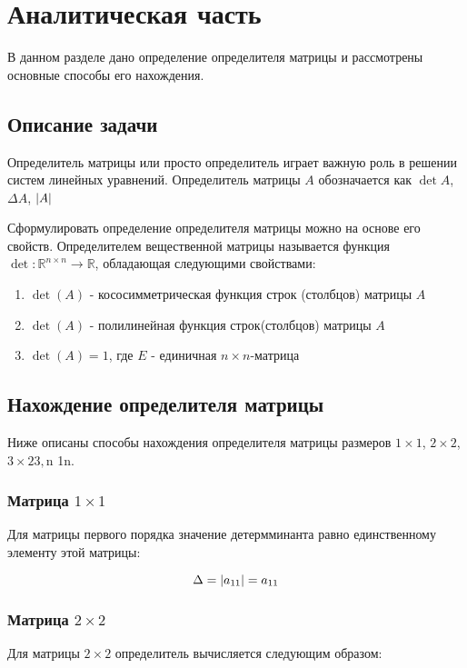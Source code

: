 \documentclass[12pt]{report}
\DeclarePairedDelimiter\abs{\lvert}{\rvert}
\begin{document}
    \chapter{Аналитическая часть}
    В данном разделе дано определение определителя матрицы и рассмотрены основные способы его нахождения.


    \section{Описание задачи}
    Определитель матрицы или просто определитель играет важную роль в решении систем линейных уравнений.
    Определитель матрицы $A$ обозначается как $\det{A}$, $\Delta{A}$, $\abs{A}$

    Сформулировать определение определителя матрицы можно на основе его свойств.
    Определителем вещественной матрицы называется функция $\det{}: \mathbb{R}^{n\times n} \rightarrow \mathbb{R}$,
    обладающая следующими свойствами:

    \begin{enumerate}
        \item $\det{(A)}$ - кососимметрическая функция строк (столбцов) матрицы $A$
        \item $\det{(A)}$ - полилинейная функция строк(столбцов) матрицы $A$
        \item $\det{(A)} = 1$, где $E$ - единичная $n \times n$-матрица
    \end{enumerate}


    \section{Нахождение определителя матрицы}
    Ниже описаны способы нахождения определителя матрицы размеров $1 \times 1$, $2 \times 2$, $3 \times 23, $n \times 1n.

    \subsection{Матрица $1 \times 1$}
    Для матрицы первого порядка значение детермминанта равно единственному элементу этой матрицы:

    \begin{equation}
        \label{eq:det_1x1}
        \Delta  = \abs{a_{11}} = a_{11}
    \end{equation}

    \subsection{Матрица $2 \times 2$}
    Для матрицы $2 \times 2$ определитель вычисляется следующим образом:
\end{document}

